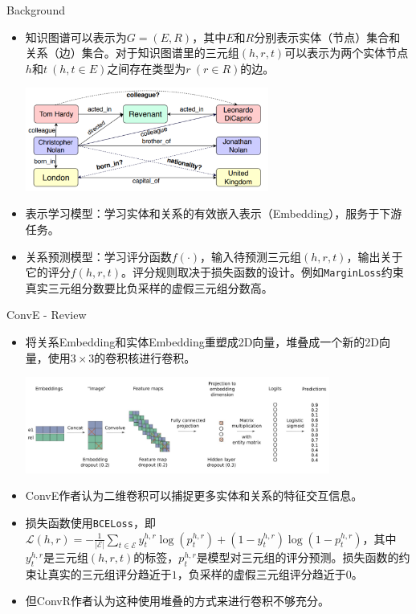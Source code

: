\begin{frame}[c]{Background}

\begin{itemize}
    \item 知识图谱可以表示为$G=(E,R)$，其中$E$和$R$分别表示实体（节点）集合和关系（边）集合。对于知识图谱里的三元组$(h,r,t)$可以表示为两个实体节点$h$和$t\ (h, t \in E)$之间存在类型为$r\ (r\in R)$的边。\\ 
    \begin{center}
        \includegraphics[width=8cm]{assets/1.png}
    \end{center}
    \item 表示学习模型：学习实体和关系的有效嵌入表示（Embedding），服务于下游任务。
    \item 关系预测模型：学习评分函数$f(\cdot)$，输入待预测三元组$(h,r,t)$，输出关于它的评分$f(h,r,t)$。评分规则取决于损失函数的设计。例如\texttt{MarginLoss}约束真实三元组分数要比负采样的虚假三元组分数高。
\end{itemize}

\end{frame}

\begin{frame}[c]{ConvE - Review}

\begin{itemize}
    \item 将关系Embedding和实体Embedding重塑成2D向量，堆叠成一个新的2D向量，使用$3\times 3$的卷积核进行卷积。\\
    \begin{center}
        \includegraphics[width=10cm]{assets/2.png}
    \end{center}
    \item ConvE作者认为二维卷积可以捕捉更多实体和关系的特征交互信息。
    \item 损失函数使用\texttt{BCELoss}，即$\mathcal{L}(h,r)=-\frac{1}{|\mathcal{E}|}\sum\limits_{t\in \mathcal{E}}y_{t}^{h,r}\log(p_{t}^{h,r})+(1-y_{t}^{h,r})\log(1-p_{t}^{h,r})$，其中$y_{t}^{h,r}$是三元组$(h,r,t)$的标签，$p_{t}^{h,r}$是模型对三元组的评分预测。损失函数的约束让真实的三元组评分趋近于$1$，负采样的虚假三元组评分趋近于$0$。
    \item 但ConvR作者认为这种使用堆叠的方式来进行卷积不够充分。
\end{itemize}

\end{frame}

